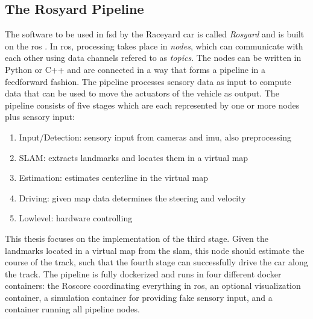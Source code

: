 \subsection{The Rosyard Pipeline}
The software to be used in \ac{fsd} by the Raceyard car is called \emph{Rosyard} and is built on the \ac{ros} \cite{ros}.
In \ac{ros}, processing takes place in \emph{nodes}, which can communicate with each other using data channels refered to as \emph{topics}. The nodes can be written in Python or C++ and are connected in a way that forms a pipeline in a feedforward fashion. The pipeline processes sensory data as input to compute data that can be used to move the actuators of the vehicle as output. The pipeline consists of five stages which are each represented by one or more nodes plus sensory input:
\begin{enumerate}
    \item Input/Detection: sensory input from cameras and \ac{imu}, also preprocessing
    \item SLAM: extracts landmarks and locates them in a virtual map
    \item Estimation: estimates centerline in the virtual map
    \item Driving: given map data determines the steering and velocity
    \item Lowlevel: hardware controlling
\end{enumerate}
This thesis focuses on the implementation of the third stage. Given the landmarks located in a virtual map from the \ac{slam}, this node should estimate the course of the track, such that the fourth stage can successfully drive the car along the track.
The pipeline is fully dockerized and runs in four different docker containers: the Roscore coordinating everything in \ac{ros}, an optional visualization container, a simulation container for providing fake sensory input, and a container running all pipeline nodes.

